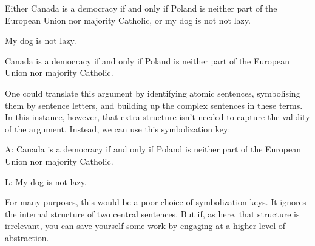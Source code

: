 \begin{earg}
  \item Either Canada is a democracy if and only if Poland is neither part of the European Union nor majority Catholic, or my dog is not not lazy.
  \item My dog is not lazy.
  \item[\therefore] Canada is a democracy if and only if Poland is neither part of the European Union nor majority Catholic.
\end{earg}

One could translate this argument by identifying atomic sentences, symbolising them by sentence letters, and building up the complex sentences in these terms.
In this instance, however, that extra structure isn't needed to capture the validity of the argument.
Instead, we can use this symbolization key:

\begin{ekey}
\item[A:] Canada is a democracy if and only if Poland is neither part of the European Union nor majority Catholic.
\item[L:] My dog is not lazy.
\end{ekey}

For many purposes, this would be a poor choice of symbolization keys.
It ignores the internal structure of two central sentences.
But if, as here, that structure is irrelevant, you can save yourself some work by engaging at a higher level of abstraction.




